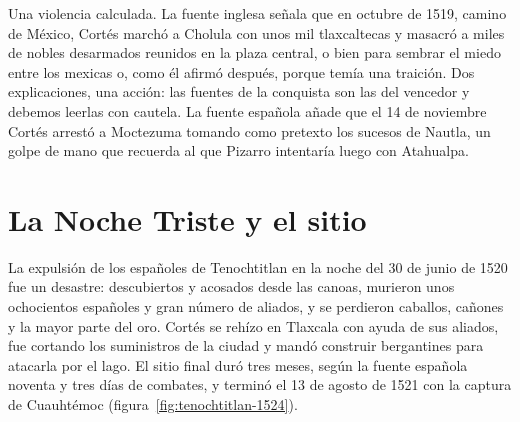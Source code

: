 \documentclass{book}
\begin{document}
Una violencia calculada. La fuente inglesa señala que en octubre de 1519, camino de México, Cortés marchó a Cholula con unos mil tlaxcaltecas y masacró a miles de nobles desarmados reunidos en la plaza central, o bien para sembrar el miedo entre los mexicas o, como él afirmó después, porque temía una traición. Dos explicaciones, una acción: las fuentes de la conquista son las del vencedor y debemos leerlas con cautela. La fuente española añade que el 14 de noviembre Cortés arrestó a Moctezuma tomando como pretexto los sucesos de Nautla, un golpe de mano que recuerda al que Pizarro intentaría luego con Atahualpa.


\section{La Noche Triste y el sitio}

La expulsión de los españoles de Tenochtitlan en la noche del 30 de junio de 1520 fue un desastre: descubiertos y acosados desde las canoas, murieron unos ochocientos españoles y gran número de aliados, y se perdieron caballos, cañones y la mayor parte del oro. Cortés se rehízo en Tlaxcala con ayuda de sus aliados, fue cortando los suministros de la ciudad y mandó construir bergantines para atacarla por el lago. El sitio final duró tres meses, según la fuente española noventa y tres días de combates, y terminó el 13 de agosto de 1521 con la captura de Cuauhtémoc (figura~\ref{fig:tenochtitlan-1524}).

\end{document}

